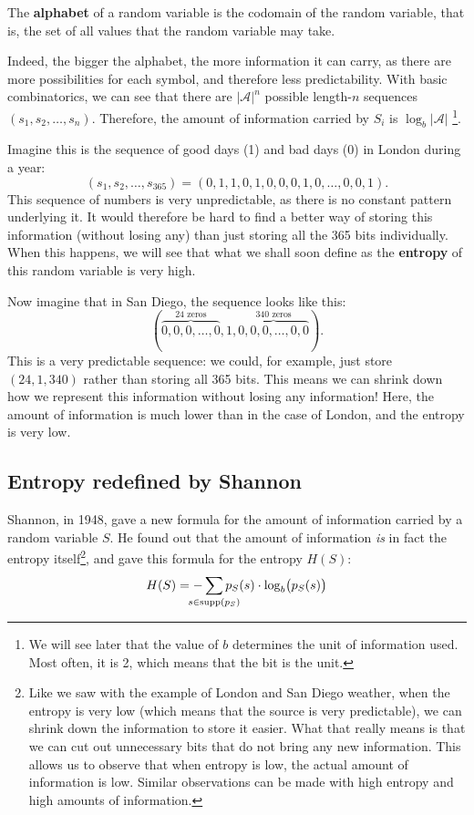 \documentclass{report}
\DeclareMathOperator{\supp}{supp}
\begin{document}
\begin{defn}
	The \textbf{alphabet} of a random variable is the codomain of the random variable, that is, the set of all values that the random variable may take.
\end{defn}
Indeed, the bigger the alphabet, the more information it can carry, as there are more possibilities for each symbol, and therefore less predictability. With basic combinatorics, we can see that there are $|\mathcal A|^n$ possible length-$n$ sequences $(s_1, s_2, \dots, s_n)$. Therefore, the amount of information carried by $S_i$ is $\log_b |\mathcal A|$ \footnote{We will see later that the value of $b$ determines the unit of information used. Most often, it is 2, which means that the bit is the unit.}.
\begin{exmp} Imagine this is the sequence of good days (1) and bad days (0) in London during a year:
\begin{equation*}
	(s_1, s_2, \dots, s_{365}) = (0, 1, 1, 0, 1, 0, 0, 0, 1, 0, \dots, 0, 0, 1).
\end{equation*}
 This sequence of numbers is very unpredictable, as there is no constant pattern underlying it. It would therefore be hard to find a better way of storing this information (without losing any) than just storing all the 365 bits individually. When this happens, we will see that what we shall soon define as the \textbf{entropy} of this random variable is very high. \par
Now imagine that in San Diego, the sequence looks like this:
\begin{equation*}
	(\overbrace{0, 0, 0, \dots, 0}^{\text{24 zeros}}, 1, \overbrace{0, 0, 0, \dots, 0, 0}^{\text{340 zeros}}).
\end{equation*}
 This is a very predictable sequence: we could, for example, just store $(24, 1, 340)$ rather than storing all 365 bits. This means we can shrink down how we represent this information without losing any information! Here, the amount of information is much lower than in the case of London, and the entropy is very low.
\end{exmp}

\subsection{Entropy redefined by Shannon}
Shannon, in 1948, gave a new formula for the amount of information carried by a random variable $S$. He found out that the amount of information \emph{is} in fact the entropy itself\footnote{Like we saw with the example of London and San Diego weather, when the entropy is very low (which means that the source is very predictable), we can shrink down the information to store it easier. What that really means is that we can cut out unnecessary bits that do not bring any new information. This allows us to observe that when entropy is low, the actual amount of information is low. Similar observations can be made with high entropy and high amounts of information.}, and gave this formula for the entropy $H(S)$:
\begin{equation}
	H(S) = -\sum_{\mathclap{s \in \supp (p_S)}} p_S(s) \cdot \log_b \bigl( p_S(s) \bigr)
\end{equation}
\end{document}
